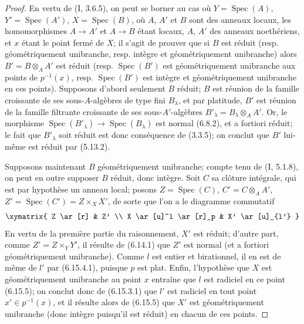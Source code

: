 \begin{proof}
En vertu de (I, 3.6.5), on peut se borner au cas où
$Y=\operatorname{Spec}(A)$, $Y'=\operatorname{Spec}(A')$,
$X=\operatorname{Spec}(B)$, où $A$, $A'$ et $B$ sont des anneaux locaux,
les homomorphismes $A\to A'$ et $A\to B$ étant locaux, $A$, $A'$ des
anneaux noethériens, et $x$ étant le point fermé de $X$; il s'agit de
prouver que si $B$ est réduit (resp. géométriquement unibranche, resp.
intègre et géométriquement unibranche) alors $B'=B\otimes_A A'$ est réduit
(resp. $\operatorname{Spec}(B')$ est géométriquement unibranche aux points
de $p^{-1}(x)$, resp. $\operatorname{Spec}(B')$ est intègre et
géométriquement unibranche en ces points). Supposons d'abord seulement
$B$ réduit; $B$ est réunion de la famille croissante de ses
sous-$A$-algèbres de type fini $B_\lambda$, et par platitude, $B'$ est
réunion de la famille filtrante croissante de ses sous-$A'$-algèbres
$B'_\lambda=B_\lambda\otimes_A A'$. Or, le morphisme
$\operatorname{Spec}(B'_\lambda)\to\operatorname{Spec}(B_\lambda)$ est
normal (6.8.2), et a fortiori réduit; le fait que $B'_\lambda$ soit réduit
est donc conséquence de (3.3.5); on conclut que $B'$ lui-même est réduit par
(5.13.2).

Supposons maintenant $B$ géométriquement unibranche; compte tenu de (I,
5.1.8), on peut en outre supposer $B$ réduit, donc intègre. Soit $C$ sa
clôture intégrale, qui est par hypothèse un anneau local; posons
$Z=\operatorname{Spec}(C)$, $C'=C\otimes_A A'$,
$Z'=\operatorname{Spec}(C')=Z\times_X X'$, de sorte que l'on a le diagramme
commutatif
\[
\xymatrix{
Z \ar[r] & Z' \\
X \ar[u]^l \ar[r]_p & X' \ar[u]_{l'}
}
\]
En vertu de la première partie du raisonnement, $X'$ est réduit; d'autre
part, comme $Z'=Z\times_Y Y'$, il résulte de (6.14.1) que $Z'$ est normal
(et a fortiori géométriquement unibranche). Comme $l$ est entier et
birationnel, il en est de même de $l'$ par (6.15.4.1), puisque $p$ est
plat. Enfin, l'hypothèse que $X$ est géométriquement unibranche au point
$x$ entraîne que $l$ est radiciel en ce point (6.15.5); on conclut donc de
(6.15.3.1) que $l'$ est radiciel en tout point $x'\in p^{-1}(x)$, et il
résulte alors de (6.15.5) que $X'$ est géométriquement unibranche (donc
intègre puisqu'il est réduit) en chacun de ces points.
\end{proof}

